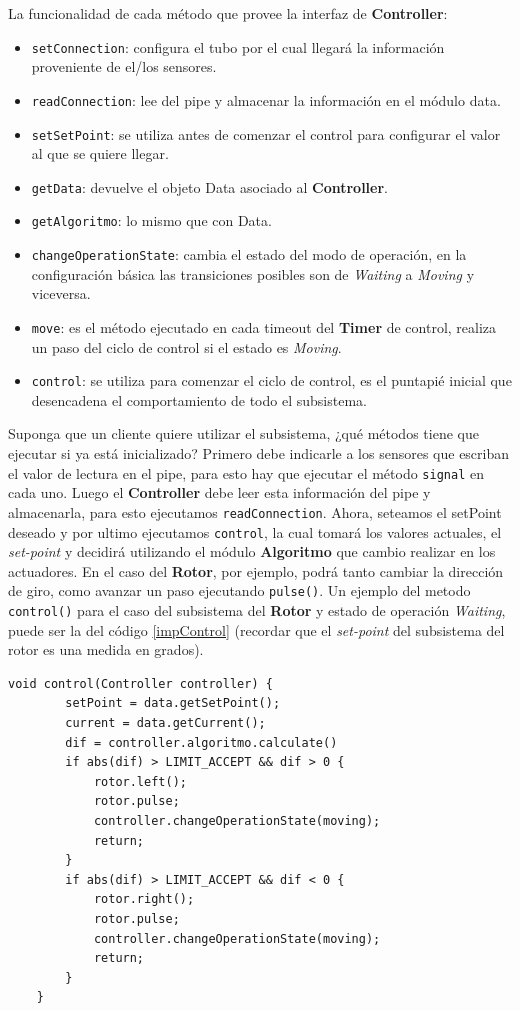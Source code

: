 La funcionalidad de cada método que provee la interfaz de \textbf{Controller}:
\begin{itemize}
    \item \verb|setConnection|: configura el tubo por el cual llegará la información proveniente de el/los sensores.
    \item \verb|readConnection|: lee del pipe y almacenar la información en el módulo data.
    \item \verb|setSetPoint|: se utiliza antes de comenzar el control para configurar el valor al que se quiere llegar.
    \item \verb|getData|: devuelve el objeto Data asociado al \textbf{Controller}.
    \item \verb|getAlgoritmo|: lo mismo que con Data.
    \item \verb|changeOperationState|: cambia el estado del modo de operación, en la configuración básica las transiciones posibles son de \textit{Waiting} a \textit{Moving} y viceversa.
    \item \verb|move|: es el método ejecutado en cada timeout del \textbf{Timer} de control, realiza un paso del ciclo de control si el estado es \textit{Moving}.
    \item \verb|control|: se utiliza para comenzar el ciclo de control, es el puntapié inicial que desencadena el comportamiento de todo el subsistema.
\end{itemize}

Suponga que un cliente quiere utilizar el subsistema, ¿qué métodos tiene que ejecutar si ya está inicializado? Primero debe indicarle a los sensores que escriban el valor de lectura en el pipe, para esto hay que ejecutar el método \verb|signal| en cada uno. Luego el \textbf{Controller} debe leer esta información del pipe y almacenarla, para esto ejecutamos \verb|readConnection|. Ahora, seteamos el setPoint deseado y por ultimo ejecutamos \verb|control|, la cual tomará los valores actuales, el \textit{set-point} y decidirá utilizando el módulo \textbf{Algoritmo} que cambio realizar en los actuadores. En el caso del \textbf{Rotor}, por ejemplo, podrá tanto cambiar la dirección de giro, como avanzar un paso ejecutando \verb|pulse()|. Un ejemplo del metodo \verb|control()| para el caso del subsistema del \textbf{Rotor} y estado de operación \textit{Waiting}, puede ser la del código \ref{impControl} (recordar que el \textit{set-point} del subsistema del rotor es una medida en grados).

\begin{lstlisting}[caption=Ejemplo de implementación del método control del módulo Controller,label={impControl}]
    void control(Controller controller) {
        setPoint = data.getSetPoint();
        current = data.getCurrent();
        dif = controller.algoritmo.calculate()
        if abs(dif) > LIMIT_ACCEPT && dif > 0 {
            rotor.left();
            rotor.pulse;
            controller.changeOperationState(moving);
            return;
        }
        if abs(dif) > LIMIT_ACCEPT && dif < 0 {
            rotor.right();
            rotor.pulse;
            controller.changeOperationState(moving);
            return;
        }
    }
\end{lstlisting}

